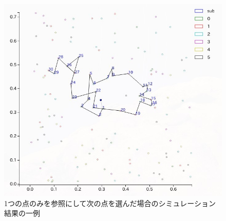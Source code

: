 \begin{figure}[H]
    \begin{center}
        \includegraphics[width=12.5cm]{../simple3/case_3.jpg}
        \caption{1つの点のみを参照にして次の点を選んだ場合のシミュレーション結果の一例}
        \label{fig:f10}
    \end{center}
\end{figure}
